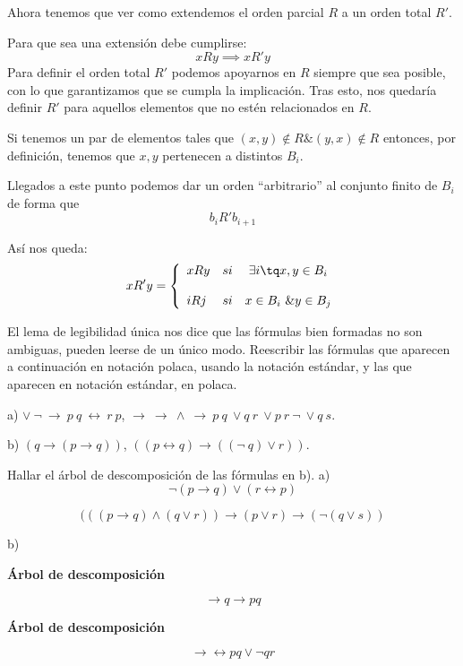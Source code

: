 \begin{problem}[2]
	Ahora tenemos que ver como extendemos el orden parcial $R$ a un orden total $R'$. 

	Para que sea una extensión debe cumplirse:
	\[xRy \implies xR'y\]
	Para definir el orden total $R'$ podemos apoyarnos en $R$ siempre que sea posible, con lo que garantizamos que se cumpla la implicación. Tras esto, nos quedaría definir $R'$ para aquellos elementos que no estén relacionados en $R$.

	Si tenemos un par de elementos tales que $(x,y)\notin R \& (y,x)\notin R$ entonces, por definición, tenemos que $x,y$ pertenecen a distintos $B_i$. 

	Llegados a este punto podemos dar un orden ``arbitrario'' al conjunto finito de $B_i$ de forma que 
	\[b_i R' b_{i+1} \]

	Así nos queda:
	\[
	xR'y = \left\{ \begin{array}{lcc}
             xRy &   si  & \exists i  \tq x,y \in B_i \\
             \\ i R j &  si  & x \in B_i \ \& y \in B_j 
             \end{array}
   \right.\]
	\end{problem}
	
	\begin{problem}[3]
	El lema de legibilidad \'unica nos dice que las f\'ormulas bien formadas no son ambiguas, pueden
	leerse de un \'unico modo. Reescribir las f\'ormulas que aparecen a continuaci\'on en notaci\'on polaca, usando
	la notaci\'on est\'andar, y las que aparecen en notaci\'on est\'andar, en polaca.
	
	a) $\vee \ \neg \ \to  \  p \  q \ \leftrightarrow \ r \  p$, 
	$\to\ \to \ \wedge \ \to \ p \ q \ \vee q \ r \ \vee p \ r \ \neg \ \vee q \ s$.
	
	b)  $(q \to  (p \to q ))$, $( (p \leftrightarrow q ) \to ((\neg \  q)  \vee  r))$.
	
	Hallar el \'arbol de descomposici\'on de las f\'ormulas en b). 
	\solution
	a)
	$$\neg(p\rightarrow q)\vee (r \leftrightarrow p)$$
	
	$$(((p\rightarrow q)\wedge (q \vee r)) \rightarrow (p \vee r) \rightarrow (\neg(q \vee s))$$
	
	b)
	
	\textbf{Árbol de descomposición}
	

	$$\rightarrow q \rightarrow pq$$
	
	\textbf{Árbol de descomposición}
	
	$$\rightarrow \leftrightarrow pq \vee \neg qr$$
	\end{problem}
	
